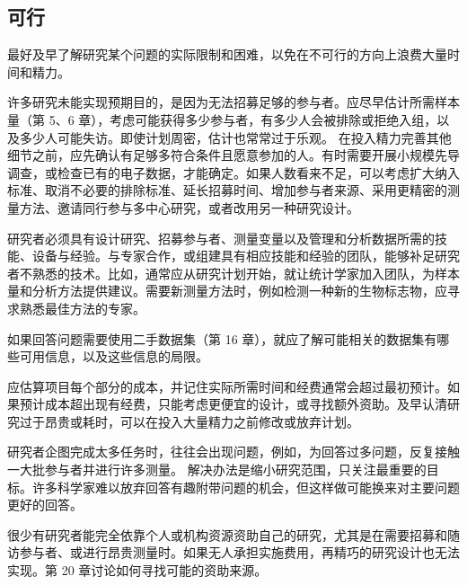 \subsection{可行}
最好及早了解研究某个问题的实际限制和困难，以免在不可行的方向上浪费大量时间和精力。
\begin{description}[leftmargin=2em,labelindent=0pt,style=nextline]
\item[参与者人数。]许多研究未能实现预期目的，是因为无法招募足够的参与者。应尽早估计所需样本量（第 5、6 章），考虑可能获得多少参与者，有多少人会被排除或拒绝入组，以及多少人可能失访。即使计划周密，估计也常常过于乐观。
在投入精力完善其他细节之前，应先确认有足够多符合条件且愿意参加的人。有时需要开展小规模先导调查，或检查已有的电子数据，才能确定。如果人数看来不足，可以考虑扩大纳入标准、取消不必要的排除标准、延长招募时间、增加参与者来源、采用更精密的测量方法、邀请同行参与多中心研究，或者改用另一种研究设计。
\item[必需的专业能力。]研究者必须具有设计研究、招募参与者、测量变量以及管理和分析数据所需的技能、设备与经验。与专家合作，或组建具有相应技能和经验的团队，能够补足研究者不熟悉的技术。比如，通常应从研究计划开始，就让统计学家加入团队，为样本量和分析方法提供建议。需要新测量方法时，例如检测一种新的生物标志物，应寻求熟悉最佳方法的专家。
\item[合适数据是否可用。]如果回答问题需要使用二手数据集（第 16 章），就应了解可能相关的数据集有哪些可用信息，以及这些信息的局限。
\item[时间与经费成本。]应估算项目每个部分的成本，并记住实际所需时间和经费通常会超过最初预计。如果预计成本超出现有经费，只能考虑更便宜的设计，或寻找额外资助。及早认清研究过于昂贵或耗时，可以在投入大量精力之前修改或放弃计划。
\item[研究范围。]研究者企图完成太多任务时，往往会出现问题，例如，为回答过多问题，反复接触一大批参与者并进行许多测量。
解决办法是缩小研究范围，只关注最重要的目标。许多科学家难以放弃回答有趣附带问题的机会，但这样做可能换来对主要问题更好的回答。
\item[获得资助的可能性。]很少有研究者能完全依靠个人或机构资源资助自己的研究，尤其是在需要招募和随访参与者、或进行昂贵测量时。如果无人承担实施费用，再精巧的研究设计也无法实现。第 20 章讨论如何寻找可能的资助来源。
\end{description}

